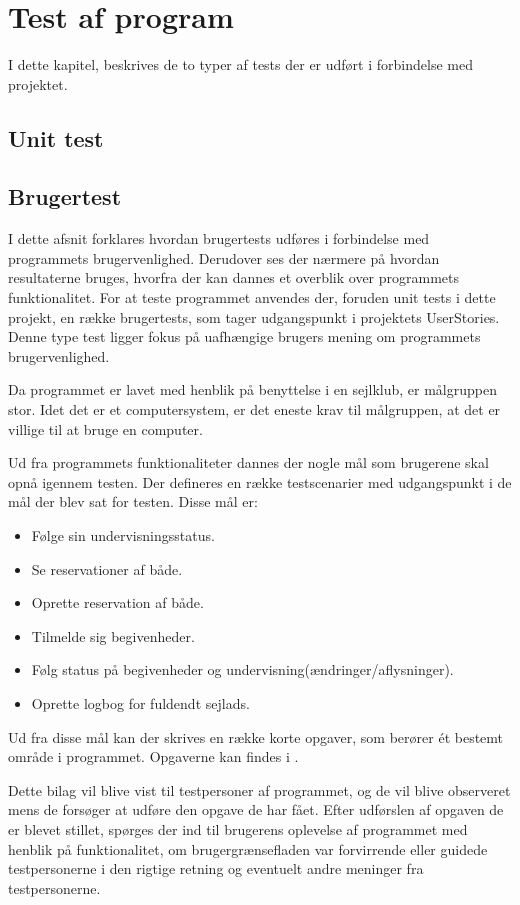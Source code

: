 \chapter{Test af program}
I dette kapitel, beskrives de to typer af tests der er udført i forbindelse med projektet.

\section{Unit test}


\section{Brugertest}
I dette afsnit forklares hvordan brugertests udføres i forbindelse med programmets brugervenlighed.
Derudover ses der nærmere på hvordan resultaterne bruges, hvorfra der kan dannes et overblik over programmets funktionalitet. 
For at teste programmet anvendes der, foruden unit tests i dette projekt, en række brugertests, som tager udgangspunkt i projektets UserStories. 
Denne type test ligger fokus på uafhængige brugers mening om programmets brugervenlighed.

Da programmet er lavet med henblik på benyttelse i en sejlklub, er målgruppen stor. 
Idet det er et computersystem, er det eneste krav til målgruppen, at det er villige til at bruge en computer.

Ud fra programmets funktionaliteter dannes der nogle mål som brugerene skal opnå igennem testen. 
Der defineres en række testscenarier med udgangspunkt i de mål der blev sat for testen.
Disse mål er:
\begin{itemize}
  \item Følge sin undervisningsstatus.
  \item Se reservationer af både.
  \item Oprette reservation af både.
  \item Tilmelde sig begivenheder.
  \item Følg status på begivenheder og undervisning(ændringer/aflysninger).
  \item Oprette logbog for fuldendt sejlads.
\end{itemize}

Ud fra disse mål kan der skrives en række korte opgaver, som berører ét bestemt område i programmet. 
Opgaverne kan findes i .

Dette bilag vil blive vist til testpersoner af programmet, og de vil blive observeret mens de forsøger at udføre den opgave de har fået. 
Efter udførslen af opgaven de er blevet stillet, spørges der ind til brugerens oplevelse af programmet med henblik på funktionalitet, om brugergrænsefladen var forvirrende eller guidede testpersonerne i den rigtige retning og eventuelt andre meninger fra testpersonerne.

